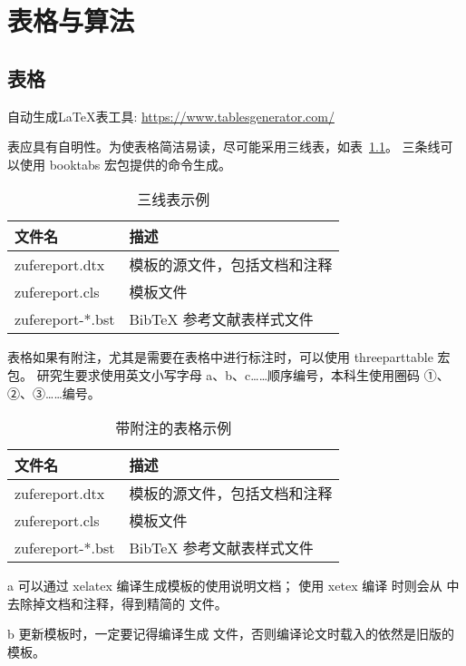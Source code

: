 \chapter{表格与算法}

\section{表格}
自动生成LaTeX表工具: \url{https://www.tablesgenerator.com/}
\par
表应具有自明性。为使表格简洁易读，尽可能采用三线表，如表~\ref{tab:three-line}。
三条线可以使用 booktabs 宏包提供的命令生成。

\begin{table}[htbp]
	\centering
	\caption{三线表示例}
	\begin{tabular}{ll}
		\toprule
		文件名          & 描述                         \\
		\midrule
		zufereport.dtx   & 模板的源文件，包括文档和注释 \\
		zufereport.cls   & 模板文件                     \\
		zufereport-*.bst & BibTeX 参考文献表样式文件    \\
		\bottomrule
	\end{tabular}
	\label{tab:three-line}
\end{table}

表格如果有附注，尤其是需要在表格中进行标注时，可以使用 threeparttable 宏包。
研究生要求使用英文小写字母 a、b、c……顺序编号，本科生使用圈码 ①、②、③……编号。

\begin{table}[htbp]
	\centering
	\begin{threeparttable}[c]
		\caption{带附注的表格示例}
		\label{tab:three-part-table}
		\begin{tabular}{ll}
			\toprule
			文件名                 & 描述                         \\
			\midrule
			zufereport.dtx\tnote{a} & 模板的源文件，包括文档和注释 \\
			zufereport.cls\tnote{b} & 模板文件                     \\
			zufereport-*.bst        & BibTeX 参考文献表样式文件    \\
			\bottomrule
		\end{tabular}
		\begin{tablenotes}
			\item [a] 可以通过 xelatex 编译生成模板的使用说明文档；
			使用 xetex 编译  时则会从  中去除掉文档和注释，得到精简的  文件。
			\item [b] 更新模板时，一定要记得编译生成  文件，否则编译论文时载入的依然是旧版的模板。
		\end{tablenotes}
	\end{threeparttable}
\end{table}

